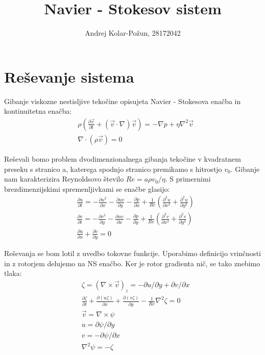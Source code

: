 \documentclass{article}
\title{Navier - Stokesov sistem}
\author{Andrej Kolar-Požun, 28172042}
\begin{document}
\maketitle
{}
\section{Reševanje sistema}

Gibanje viskozne nestisljive tekočine opisujeta Navier - Stokesova enačba in kontinuitetna enačba:
\begin{align*}
& \rho \left(\frac{\partial \vec{v}}{\partial t} + (\vec{v} \cdot \nabla) \vec{v} \right)= -\nabla p + \eta \nabla^2 \vec{v} \\
& \nabla \cdot (\rho \vec{v}) = 0
\end{align*}

Reševali bomo problem dvodimenzionalnega gibanja tekočine v kvadratnem preseku s stranico a, katerega spodnjo stranico premikamo s hitrostjo $v_0$.
Gibanje nam karakterizira Reynoldsovo število $Re = a \rho v_0 / \eta$.
S primernimi brezdimenzijskimi spremenljivkami se enačbe glasijo:
\begin{align*}
&\frac{\partial u}{\partial t} = - \frac{\partial u^2}{\partial x} - \frac{\partial uv}{\partial y} - \frac{\partial p}{\partial x} + \frac{1}{Re}\left( \frac{\partial^2 u}{\partial x^2} + \frac{\partial ^2 u}{\partial y^2} \right) \\
&\frac{\partial v}{\partial t} = - \frac{\partial v^2}{\partial y} - \frac{\partial uv}{\partial x} - \frac{\partial p}{\partial y} + \frac{1}{Re}\left( \frac{\partial^2 v}{\partial x^2} + \frac{\partial ^2 v}{\partial y^2} \right) \\
& \frac{\partial u}{\partial x} + \frac{\partial v}{\partial y} = 0
\end{align*}



Reševanja se bom lotil z uvedbo tokovne funkcije. Uporabimo definicijo vrinčnosti in z rotorjem delujemo na NS enačbo. Ker je rotor gradienta nič, se tako znebimo tlaka:
\begin{align*}
&\zeta = (\nabla \times \vec{v})_z = -\partial u/\partial y + \partial v/ \partial x \\
&\frac{\partial \zeta}{\partial t} + \frac{\partial(u \zeta)}{\partial x} + \frac{\partial(v \zeta)}{\partial y} - \frac{1}{Re} \nabla^2 \zeta = 0 \\
&\vec{v} = \nabla \times \psi \\
&u = \partial \psi / \partial y \\
&v = -\partial \psi / \partial x \\
& \nabla^2 \psi = -\zeta
\end{align*}
\end{document}
